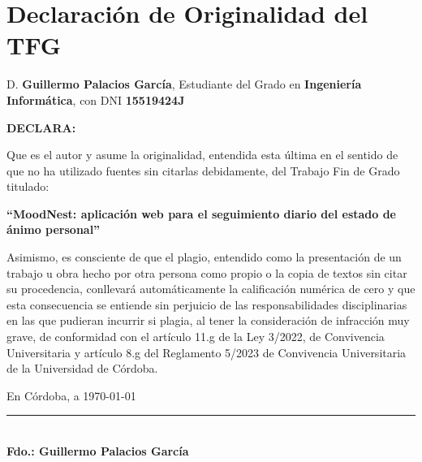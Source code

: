 \newpage
\thispagestyle{empty} %

\section*{Declaración de Originalidad del TFG}
\vspace{1cm}


D. \textbf{Guillermo Palacios García}, Estudiante del Grado en \textbf{Ingeniería Informática}, con DNI \textbf{15519424J}

\vspace{1cm}

\noindent \textbf{DECLARA:}

\vspace{0.5cm}

Que es el autor y asume la originalidad, entendida esta última en el sentido de que no ha utilizado fuentes sin citarlas debidamente, del Trabajo Fin de Grado titulado: 

\vspace{0.7cm}

\textbf{``MoodNest: aplicación web para el seguimiento diario del estado de ánimo personal''}

\vspace{0.7cm}

Asimismo, es consciente de que el plagio, entendido como la presentación de un trabajo u obra hecho por otra persona como propio o la copia de textos sin citar su procedencia, conllevará automáticamente la calificación numérica de cero y que esta consecuencia se entiende sin perjuicio de las responsabilidades disciplinarias en las que pudieran incurrir si plagia, al tener la consideración de infracción muy grave, de conformidad con el artículo 11.g de la Ley 3/2022, de Convivencia Universitaria y artículo 8.g del Reglamento 5/2023 de Convivencia Universitaria de la Universidad de Córdoba.

\vspace{2.5cm}

En Córdoba, a \today 

\vspace{3cm}

\begin{center}
    \noindent \rule{7cm}{0.4pt} \\
    \vspace{0.2cm}
    \textbf{Fdo.: Guillermo Palacios García}
\end{center}

\cleardoublepage
